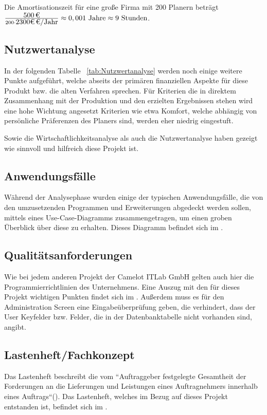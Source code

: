 Die Amortisationszeit für eine große Firma mit 200 Planern beträgt
$\frac{\eur{500}}{200 \cdot \eur{2300€} \mbox{/Jahr} } \approx 0,001 \mbox{ Jahre} \approx 9 \mbox{ Stunden}$.

\subsection{Nutzwertanalyse}
\label{sec:Nutzwertanalyse}
In der folgenden Tabelle ~\ref{tab:Nutzwertanalyse} werden noch einige weitere Punkte aufgeführt, welche abseits der primären finanziellen Aspekte für diese Produkt bzw. die alten Verfahren sprechen. Für Kriterien die in direktem Zusammenhang mit der Produktion und den erzielten Ergebnissen stehen wird eine hohe Wichtung angesetzt Kriterien wie etwa Komfort, welche abhängig von persönliche Präferenzen des Planers sind, werden eher niedrig eingestuft.


Sowie die Wirtschaftlichkeitsanalyse als auch die Nutzwertanalyse haben gezeigt wie sinnvoll und hilfreich diese Projekt ist.

\subsection{Anwendungsfälle}
\label{sec:Anwendungsfaelle}
Während der Analysephase wurden einige der typischen Anwendungsfälle, die von den umzusetzenden Programmen und Erweiterungen abgedeckt werden sollen, mittels eines Use-Case-Diagramms zusammengetragen, um einen groben Überblick über diese zu erhalten. Dieses Diagramm befindet sich im .

\subsection{Qualitätsanforderungen}
\label{sec:Qualitaetsanforderungen}
Wie bei jedem anderen Projekt der Camelot ITLab GmbH gelten auch hier die Programmierrichtlinien des Unternehmens. Eine Auszug mit den für dieses Projekt wichtigen Punkten findet sich im . Außerdem muss es für den Administration Screen eine Eingabeüberprüfung geben, die verhindert, dass der User Keyfelder bzw. Felder, die in der Datenbanktabelle nicht vorhanden sind, angibt.

\subsection{Lastenheft/Fachkonzept}
\label{sec:Lastenheft}
Das Lastenheft beschreibt die vom ``Auftraggeber festgelegte Gesamtheit der Forderungen an die Lieferungen und Leistungen eines Auftragnehmers innerhalb eines Auftrags``(\cite{Wiki.Induux}). Das Lastenheft, welches im Bezug auf dieses Projekt entstanden ist, befindet sich im . 

